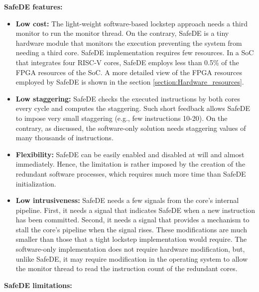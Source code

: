 \bigskip

\textbf{SafeDE features:}

\begin{itemize}
    \item \textbf{Low cost:} The light-weight software-based lockstep approach needs a third monitor to run the monitor thread. On the contrary, SafeDE is a tiny hardware module that monitors the execution preventing the system from needing a third core. SafeDE implementation requires few resources. In a SoC that integrates four RISC-V cores, SafeDE employs less than 0.5\% of the FPGA resources of the SoC. A more detailed view of the FPGA resources employed by SafeDE is shown in the section \ref{section:Hardware_resources}.

    \item \textbf{Low staggering:} SafeDE checks the executed instructions by both cores every cycle and computes the staggering. Such short feedback allows SafeDE to impose very small staggering (e.g., few instructions 10-20). On the contrary, as discussed, the software-only solution needs staggering values of many thousands of instructions.

    \item \textbf{Flexibility:} SafeDE can be easily enabled and disabled at will and almost immediately. Hence, the limitation is rather imposed by the creation of the redundant software processes, which requires much more time than SafeDE initialization. 

    \item \textbf{Low intrusiveness:} SafeDE needs a few signals from the core's internal pipeline. First, it needs a signal that indicates SafeDE when a new instruction has been committed. Second, it needs a signal that provides a mechanism to stall the core's pipeline when the signal rises. These modifications are much smaller than those that a tight lockstep implementation would require. The software-only implementation does not require hardware modification, but, unlike SafeDE, it may require modification in the operating system to allow the monitor thread to read the instruction count of the redundant cores. 
\end{itemize}

\bigskip

\textbf{SafeDE limitations:}

